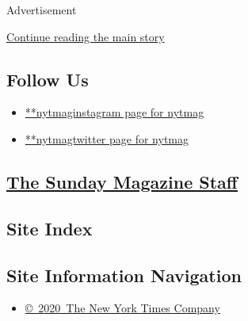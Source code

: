 Advertisement

\protect\hyperlink{after-mktg}{Continue reading the main story}

\hypertarget{follow-us}{%
\subsection{Follow Us}\label{follow-us}}

\begin{itemize}
\tightlist
\item
  \href{https://instagram.com/nytmag}{**nytmaginstagram page for nytmag}
\item
  \href{https://twitter.com/nytmag}{**nytmagtwitter page for nytmag}
\end{itemize}

\subsection{}

\hypertarget{the-sunday-magazine-staff}{%
\subsection{\texorpdfstring{\href{\%0Ahttps://www.nytimes3xbfgragh.onion/interactive/magazine/masthead.html}{The
Sunday Magazine
Staff}}{The Sunday Magazine Staff}}\label{the-sunday-magazine-staff}}

\hypertarget{site-index}{%
\subsection{Site Index}\label{site-index}}

\hypertarget{site-information-navigation}{%
\subsection{Site Information
Navigation}\label{site-information-navigation}}

\begin{itemize}
\tightlist
\item
  \href{https://help.nytimes3xbfgragh.onion/hc/en-us/articles/115014792127-Copyright-notice}{©~2020~The
  New York Times Company}
\end{itemize}

